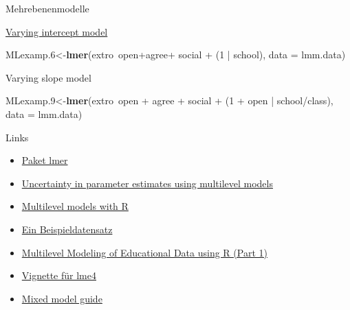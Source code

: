 \documentclass[ignorenonframetext,]{beamer}
\newenvironment{Shaded}{}{}
\newcommand{\KeywordTok}[1]{\textcolor[rgb]{0.00,0.44,0.13}{\textbf{{#1}}}}
\newcommand{\DataTypeTok}[1]{\textcolor[rgb]{0.56,0.13,0.00}{{#1}}}
\newcommand{\DecValTok}[1]{\textcolor[rgb]{0.25,0.63,0.44}{{#1}}}
\newcommand{\FloatTok}[1]{\textcolor[rgb]{0.25,0.63,0.44}{{#1}}}
\newcommand{\StringTok}[1]{\textcolor[rgb]{0.25,0.44,0.63}{{#1}}}
\newcommand{\NormalTok}[1]{{#1}}
\begin{document}
\begin{frame}[fragile]{Mehrebenenmodelle}
\begin{block}{\href{https://www.jaredknowles.com/journal/2013/11/25/getting-started-with-mixed-effect-models-in-r}{Varying
intercept model}}
\begin{Shaded}
\begin{Highlighting}[]
\NormalTok{MLexamp}\FloatTok{.6}\NormalTok{<-}\KeywordTok{lmer}\NormalTok{(extro~open+agree+}\StringTok{ }\NormalTok{social +}\StringTok{ }\NormalTok{(}\DecValTok{1} \NormalTok{|}\StringTok{ }\NormalTok{school), }
                \DataTypeTok{data =} \NormalTok{lmm.data)}
\end{Highlighting}
\end{Shaded}

\end{block}

\begin{block}{Varying slope model}

\begin{Shaded}
\begin{Highlighting}[]
\NormalTok{MLexamp}\FloatTok{.9}\NormalTok{<-}\KeywordTok{lmer}\NormalTok{(extro~open +}\StringTok{ }\NormalTok{agree +}\StringTok{ }\NormalTok{social +}\StringTok{ }
\StringTok{                  }\NormalTok{(}\DecValTok{1} \NormalTok{+}\StringTok{ }\NormalTok{open |}\StringTok{ }\NormalTok{school/class), }
                \DataTypeTok{data =} \NormalTok{lmm.data)}
\end{Highlighting}
\end{Shaded}

\end{block}

\begin{block}{Links}

\begin{itemize}
\item
  \href{https://cran.r-project.org/doc/contrib/Bliese_Multilevel.pdf}{Paket
  lmer}
\item
  \href{https://www.r-bloggers.com/uncertainty-in-parameter-estimates-using-multilevel-models/}{Uncertainty
  in parameter estimates using multilevel models}
\item
  \href{https://cran.r-project.org/doc/contrib/Bliese_Multilevel.pdf}{Multilevel
  models with R}
\item
  \href{https://www.jaredknowles.com/journal/2013/11/25/getting-started-with-mixed-effect-models-in-r}{Ein
  Beispieldatensatz}
\item
  \href{https://www.r-bloggers.com/multilevel-modeling-of-educational-data-using-r-part-1/}{Multilevel
  Modeling of Educational Data using R (Part 1)}
\item
  \href{https://cran.r-project.org/web/packages/lme4/vignettes/lmer.pdf}{Vignette
  für lme4}
\item
  \href{http://ase.tufts.edu/gsc/gradresources/guidetomixedmodelsinr/mixed\%20model\%20guide.html}{Mixed
  model guide}
\end{itemize}

\end{block}

\end{frame}
\end{document}
